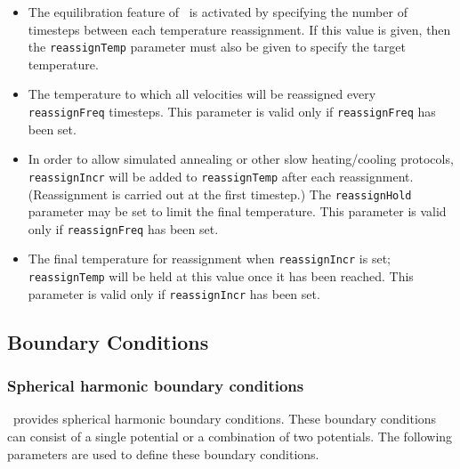 \begin{itemize}

\item
{}
{The equilibration feature of \NAMD\ is activated by 
specifying the number of timesteps between each temperature reassignment.
If this value is given, then the {\tt reassignTemp} parameter must also 
be given to specify the target temperature. }

\item
{}
{The temperature to which all velocities will be reassigned
every {\tt reassignFreq} timesteps.  
This parameter is valid only if {\tt reassignFreq} has been set.}

\item
{}
{In order to allow simulated annealing or other slow heating/cooling protocols, {\tt reassignIncr} will be added to {\tt reassignTemp} after each reassignment.
(Reassignment is carried out at the first timestep.)  The {\tt reassignHold} parameter may be set to limit the final temperature.
This parameter is valid only if {\tt reassignFreq} has been set.}

\item
{}
{The final temperature for reassignment when {\tt reassignIncr} is set; {\tt reassignTemp} will be held at this value once it has been reached.
This parameter is valid only if {\tt reassignIncr} has been set.}

\end{itemize}

\subsection{Boundary Conditions}

\subsubsection{Spherical harmonic boundary conditions}

\NAMD\ provides spherical harmonic boundary conditions.  These 
boundary conditions can consist of a single potential or a 
combination of two potentials.
The following parameters are used to define these boundary conditions.  

